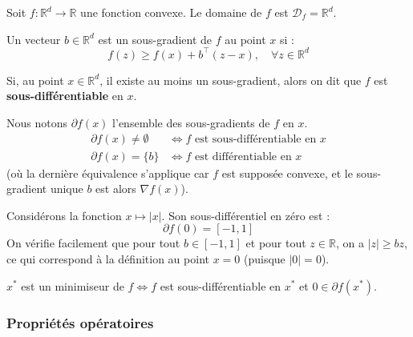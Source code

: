 Soit $f : \mathbb{R}^d \to \mathbb{R}$ une fonction convexe. Le domaine de $f$ est $\mathcal{D}_f = \mathbb{R}^d$.

\begin{definition}
    Un vecteur $b \in \mathbb{R}^d$ est un sous-gradient de $f$ au point $x$ si :
    \begin{equation}
        f(z) \ge f(x) + b^\top (z - x), \quad \forall z \in \mathbb{R}^d
    \end{equation}
\end{definition}

Si, au point $x \in \mathbb{R}^d$, il existe au moins un sous-gradient, alors on dit que $f$ est \textbf{sous-différentiable} en $x$.

Nous notons $\partial f(x)$ l'ensemble des sous-gradients de $f$ en $x$.
\begin{align*}
    \partial f(x) \neq \emptyset &\iff f \text{ est sous-différentiable en } x \\
    \partial f(x) = \{b\} &\iff f \text{ est différentiable en } x
\end{align*}
(où la dernière équivalence s'applique car $f$ est supposée convexe, et le sous-gradient unique $b$ est alors $\nabla f(x)$).

\begin{exemple}
    Considérons la fonction $x \mapsto |x|$. Son sous-différentiel en zéro est :
    \begin{equation}
        \partial f(0) = [-1, 1]
    \end{equation}
    On vérifie facilement que pour tout $b \in [-1, 1]$ et pour tout $z \in \mathbb{R}$, on a $|z| \ge b z$, ce qui correspond à la définition au point $x=0$ (puisque $|0|=0$).
\end{exemple}

\begin{theoreme}
    $x^*$ est un minimiseur de $f \iff f$ est sous-différentiable en $x^*$ et $0 \in \partial f(x^*)$.
\end{theoreme}

\subsubsection{Propriétés opératoires}

